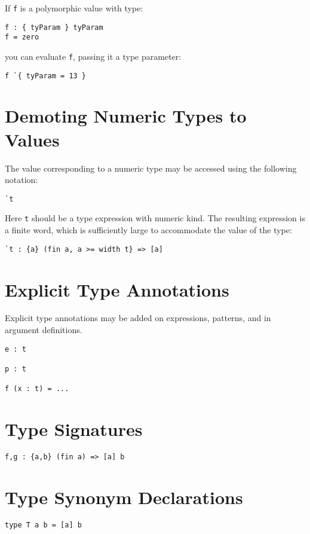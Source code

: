 If \texttt{f} is a polymorphic value with type:

\begin{verbatim}
f : { tyParam } tyParam
f = zero
\end{verbatim}

you can evaluate \texttt{f}, passing it a type parameter:

\begin{verbatim}
f `{ tyParam = 13 }
\end{verbatim}

\section{Demoting Numeric Types to
Values}\label{demoting-numeric-types-to-values}

The value corresponding to a numeric type may be accessed using the
following notation:

\begin{verbatim}
`t
\end{verbatim}

Here \texttt{t} should be a type expression with numeric kind. The
resulting expression is a finite word, which is sufficiently large to
accommodate the value of the type:

\begin{verbatim}
`t : {a} (fin a, a >= width t} => [a]
\end{verbatim}

\section{Explicit Type Annotations}\label{explicit-type-annotations}

Explicit type annotations may be added on expressions, patterns, and in
argument definitions.

\begin{verbatim}
e : t

p : t

f (x : t) = ...
\end{verbatim}

\section{Type Signatures}\label{type-signatures}

\begin{verbatim}
f,g : {a,b} (fin a) => [a] b
\end{verbatim}

\section{Type Synonym Declarations}\label{type-synonym-declarations}

\begin{verbatim}
type T a b = [a] b
\end{verbatim}
